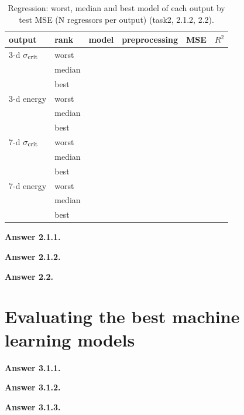\documentclass[11pt]{article}
\newcommand{\sig}{\sigma_{\rm crit}}
\newcommand{\ans}[1]{\textbf{Answer #1.}}            %
\newcommand{\nb}[2]{{\small(task#1, #2)}}            %
\begin{document}
\begin{table}[htb]\centering\small
\caption{Regression: worst, median and best model of each output by test MSE (N regressors per output) \nb{2}{2.1.2, 2.2}.}
\begin{tabular}{@{}llllrc@{}}\toprule
output & rank & model & preprocessing & MSE & $R^2$\\\midrule
3-d $\sig$ & worst & & & & \\
 & median & & & & \\
 & best & & & & \\\midrule
3-d energy & worst & & & & \\
 & median & & & & \\
 & best & & & & \\\midrule
7-d $\sig$ & worst & & & & \\
 & median & & & & \\
 & best & & & & \\\midrule
7-d energy & worst & & & & \\
 & median & & & & \\
 & best & & & & \\\bottomrule
\end{tabular}
\end{table}

\ans{2.1.1} %

\ans{2.1.2} %

\ans{2.2} %

\section{Evaluating the best machine learning models}

\ans{3.1.1} %

\ans{3.1.2} %

\ans{3.1.3} %
\end{document}
